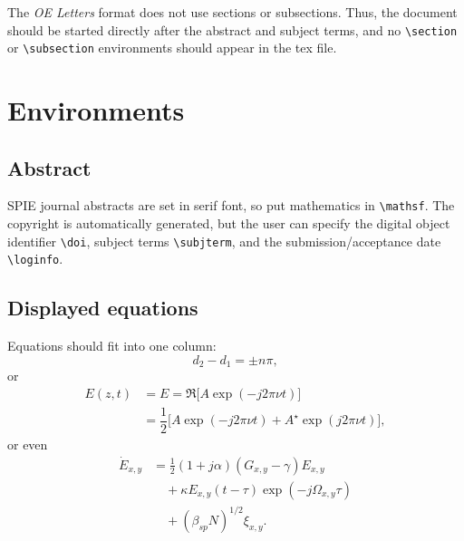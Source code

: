 \documentclass[10pt,letterpaper,optenglett,fleqn]{article}      %
\begin{document}
The \emph{OE Letters} format does not use sections or subsections.
Thus, the document should be started directly after the abstract and
subject terms, and no \verb+\section+ or \verb+\subsection+
environments should appear in the tex file.



\section{Environments}

\subsection{Abstract}

SPIE journal abstracts are set in serif font, so put mathematics in
\verb+\mathsf+. The copyright is automatically generated, but the
user can specify the digital object identifier \verb+\doi+, subject
terms \verb+\subjterm+, and the submission/acceptance date
\verb+\loginfo+.


\subsection{Displayed equations}

Equations should fit into one column:
    \begin{equation}
    \label{eqn:app1-youngs_exp}%
    d_2 - d_1 = \pm n \pi,
    \end{equation}
or
    \begin{equation}
    \label{eqn:app1-light_fund}%
    \begin{split}
    E(z,t) & = E = \Re \bigl [ A \exp \left ( -j 2 \pi \nu t
    \right ) \bigr ]
    \\
    & = \dfrac{1}{2} \bigl [ A \exp \left ( -j 2 \pi \nu t
    \right ) + A^{\star} \exp \left ( j 2 \pi \nu t \right ) \bigr ],
    \end{split}
    \end{equation}
or even
    \begin{align}
    {\dot{E}_{x,y}} &=\frac{1}{2}\left( 1+j\alpha \right) \left( G_{x,y}
    - \gamma \right) E_{x,y}  \label{Eq1} \nonumber
    \\
    & \quad + \kappa E_{x,y}\left( t-\tau \right) \exp \left( -j
    \Omega_{x,y}\tau \right) \nonumber
    \\
    & \quad + (\beta _{sp}N)^{1/2} \xi _{x,y}.
    \end{align}
\end{document}
